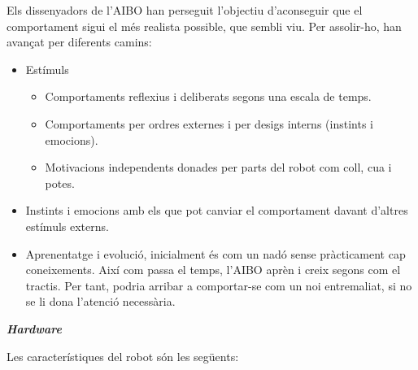 \documentclass[12pt,a4paper,final,twoside]{article}
\begin{document}
Els dissenyadors de l'AIBO han perseguit l'objectiu d'aconseguir que el comportament sigui el més realista possible, que sembli viu. Per assolir-ho, han avançat per diferents camins:
\begin{itemize}
\item Estímuls
\begin{itemize}
\item Comportaments reflexius i deliberats segons una escala de temps.
\item Comportaments per ordres externes i per desigs interns (instints i emocions).
\item Motivacions independents donades per parts del robot com coll, cua i potes.
\end{itemize}
\item Instints i emocions amb els que pot canviar el comportament davant d'altres estímuls externs.
\item Aprenentatge i evolució, inicialment és com un nadó sense pràcticament cap coneixements. Així com passa el temps, l'AIBO aprèn i creix segons com el tractis. Per tant, podria arribar a comportar-se com un noi entremaliat, si no se li dona l'atenció necessària.
\end{itemize}



\vspace{20pt}
\textbf{\textit{Hardware}}
\label{Hardware}

Les característiques del robot són les següents: \cite{Anshar2007}
\end{document}
